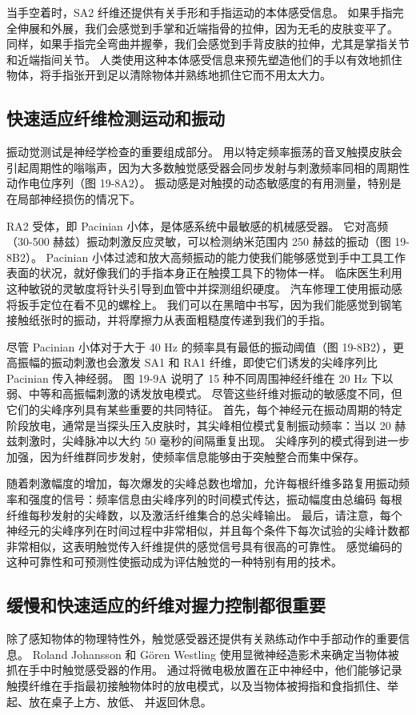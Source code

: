 当手空着时，SA2 纤维还提供有关手形和手指运动的本体感受信息。 如果手指完全伸展和外展，我们会感觉到手掌和近端指骨的拉伸，因为无毛的皮肤变平了。 同样，如果手指完全弯曲并握拳，我们会感觉到手背皮肤的拉伸，尤其是掌指关节和近端指间关节。 人类使用这种本体感受信息来预先塑造他们的手以有效地抓住物体，将手指张开到足以清除物体并熟练地抓住它而不用太大力。

\subsection{快速适应纤维检测运动和振动}
振动觉测试是神经学检查的重要组成部分。 用以特定频率振荡的音叉触摸皮肤会引起周期性的嗡嗡声，因为大多数触觉感受器会同步发射与刺激频率同相的周期性动作电位序列（图 19-8A2）。 振动感是对触摸的动态敏感度的有用测量，特别是在局部神经损伤的情况下。

RA2 受体，即 Pacinian 小体，是体感系统中最敏感的机械感受器。 它对高频（30-500 赫兹）振动刺激反应灵敏，可以检测纳米范围内 250 赫兹的振动（图 19-8B2）。 Pacinian 小体过滤和放大高频振动的能力使我们能够感觉到手中工具工作表面的状况，就好像我们的手指本身正在触摸工具下的物体一样。 临床医生利用这种敏锐的灵敏度将针头引导到血管中并探测组织硬度。 汽车修理工使用振动感将扳手定位在看不见的螺栓上。 我们可以在黑暗中书写，因为我们能感觉到钢笔接触纸张时的振动，并将摩擦力从表面粗糙度传递到我们的手指。

尽管 Pacinian 小体对于大于 40 Hz 的频率具有最低的振动阈值（图 19-8B2），更高振幅的振动刺激也会激发 SA1 和 RA1 纤维，即使它们诱发的尖峰序列比 Pacinian 传入神经弱。 图 19-9A 说明了 15 种不同周围神经纤维在 20 Hz 下以弱、中等和高振幅刺激的诱发放电模式。 尽管这些纤维对振动的敏感度不同，但它们的尖峰序列具有某些重要的共同特征。 首先，每个神经元在振动周期的特定阶段放电，通常是当探头压入皮肤时，其尖峰相位模式复制振动频率：当以 20 赫兹刺激时，尖峰脉冲以大约 50 毫秒的间隔重复出现。 尖峰序列的模式得到进一步加强，因为纤维群同步发射，使频率信息能够由于突触整合而集中保存。

随着刺激幅度的增加，每次爆发的尖峰总数也增加，允许每根纤维多路复用振动频率和强度的信号：频率信息由尖峰序列的时间模式传达，振动幅度由总编码 每根纤维每秒发射的尖峰数，以及激活纤维集合的总尖峰输出。 最后，请注意，每个神经元的尖峰序列在时间过程中非常相似，并且每个条件下每次试验的尖峰计数都非常相似，这表明触觉传入纤维提供的感觉信号具有很高的可靠性。 感觉编码的这种可靠性和可预测性使振动成为评估触觉的一种特别有用的技术。

\subsection{缓慢和快速适应的纤维对握力控制都很重要}
除了感知物体的物理特性外，触觉感受器还提供有关熟练动作中手部动作的重要信息。 Roland Johansson 和 Gören Westling 使用显微神经造影术来确定当物体被抓在手中时触觉感受器的作用。 通过将微电极放置在正中神经中，他们能够记录触摸纤维在手指最初接触物体时的放电模式，以及当物体被拇指和食指抓住、举起、放在桌子上方、放低、 并返回休息。

